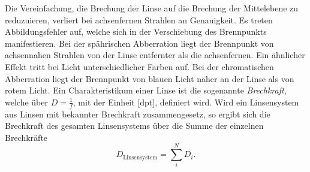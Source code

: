 Die Vereinfachung, die Brechung der Linse auf die Brechung der Mittelebene zu reduzuieren, verliert bei achsenfernen Strahlen an Genauigkeit. Es treten Abbildungsfehler auf, welche sich in der Verschiebung des Brennpunkts manifestieren. Bei der spährischen Abberration liegt der Brennpunkt von achsennahen Strahlen von der Linse entfernter als die achsenfernen. Ein ähnlicher Effekt tritt bei Licht unterschiedlicher Farben auf. Bei der chromatischen Abberration liegt der Brennpunkt von blauen Licht näher an der Linse als von rotem Licht. 
Ein Charakteristikum einer Linse ist die sogenannte \textit{Brechkraft}, welche über $D=\frac{1}{f}$, mit der Einheit [dpt], definiert wird. 
Wird ein Linsensystem aus Linsen mit bekannter Brechkraft zusammengesetz, so ergibt sich die Brechkraft des gesamten Linsensystems über die Summe der einzelnen Brechkräfte
\begin{equation}
    D_\text{Linsensystem}=\sum_i^N D_i .
\end{equation}








